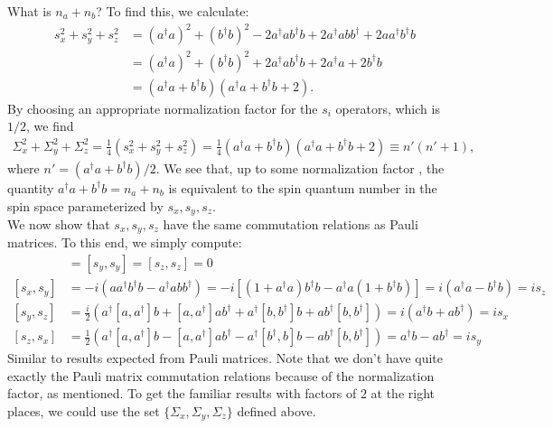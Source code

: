 \documentclass{article}
\theoremstyle{definition}
\newcommand{\f}[2]{\frac{#1}{#2}}
\begin{document}
\begin{enumerate}[label=\alph*)]
\noindent What is $n_a + n_b$? To find this, we calculate:
\begin{align*}
s_x^2 + s_y^2 + s_z^2 
&= (a^\dagger a)^2 + (b^\dagger b)^2 - 2a^\dagger a b^\dagger b + 2a^\dagger a bb^\dagger + 2 aa^\dagger b^\dagger b  \\
&=  (a^\dagger a)^2 + (b^\dagger b)^2 + 2a^\dagger a b^\dagger b + 2a^\dagger a + 2b^\dagger b \\
&= (a^\dagger a + b^\dagger b) ( a^\dagger a + b^\dagger b + 2).
\end{align*}
By choosing an appropriate normalization factor for the $s_i$ operators, which is $1/2$, we find 
\begin{align*}
\Sigma_x^2 + \Sigma_y^2 + \Sigma_z^2 = \f{1}{4}(s_x^2 + s_y^2 + s_z^2) = \f{1}{4} (a^\dagger a + b^\dagger b) ( a^\dagger a + b^\dagger b + 2) \equiv n' (n'+1),
\end{align*}
where $n' = (a^\dagger a + b^\dagger b)/2$. We see that, up to some normalization factor , the quantity $a^\dagger a + b^\dagger b = n_a + n_b$ is equivalent to the spin quantum number in the spin space parameterized by $s_x, s_y, s_z$. \\


\noindent We now show that $s_x, s_y, s_z$ have the same commutation relations as Pauli matrices. To this end, we simply compute:
\begin{align*}
[s_x, s_x] &= [s_y, s_y] = [s_z, s_z] = 0\\
[s_x, s_y] &= -i (aa^\dagger b^\dagger b - a^\dagger a bb^\dagger) = -i [ (1 + a^\dagger a)b^\dagger b - a^\dagger a(1+b^\dagger b)  ] = i( a^\dagger a - b^\dagger b ) = i s_z  \\
[s_y, s_z] &= \f{i}{2} ( a^\dagger [a,a^\dagger] b + [a,a^\dagger]ab^\dagger + a^\dagger [b,b^\dagger] b + ab^\dagger [b,b^\dagger]) =  i ( a^\dagger b + ab^\dagger) =  i s_x \\
[s_z, s_x] &= \f{1}{2} (a^\dagger [a,a^\dagger] b - [a,a^\dagger] ab^\dagger - a^\dagger [b^\dagger,b] b - ab^\dagger[b,b^\dagger]) = a^\dagger b - ab^\dagger =  is_y
\end{align*}
Similar to results expected from Pauli matrices. Note that we don't have quite exactly the Pauli matrix commutation relations because of the normalization factor, as mentioned. To get the familiar results with factors of $2$ at the right places, we could use the set $\{ \Sigma_x, \Sigma_y, \Sigma_z \}$ defined above. 


\end{enumerate}
\end{document}
